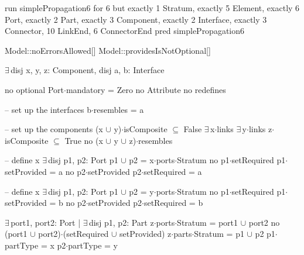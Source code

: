 run simplePropagation6 for 6 but exactly 1 Stratum, exactly 5 Element, exactly 6 Port, exactly 2 Part, exactly 3 Component, exactly 2 Interface, exactly 3 Connector, 10 LinkEnd, 6 ConnectorEnd
pred simplePropagation6
{
  Model::noErrorsAllowed[]
  Model::providesIsNotOptional[]

  $\exists\,$disj x, y, z: Component,
       disj a, b: Interface
  {
    no optional
    Port$\cdot$mandatory = Zero
    no Attribute
    no redefines
  
    -- set up the interfaces
    b$\cdot$resembles = a    
  
    -- set up the components
    (x $\cup$ y)$\cdot$isComposite $\subseteq$ False
    $\exists\,$x$\cdot$links
    $\exists\,$y$\cdot$links
    z$\cdot$isComposite $\subseteq$ True
    no (x $\cup$ y $\cup$ z)$\cdot$resembles
    
    -- define x
    $\exists\,$disj p1, p2: Port
    {
      p1 $\cup$ p2 = x$\cdot$ports$\cdot$Stratum
      no p1$\cdot$setRequired
      p1$\cdot$setProvided = a
      no p2$\cdot$setProvided
      p2$\cdot$setRequired = a
    }
    
    -- define x
    $\exists\,$disj p1, p2: Port
    {
      p1 $\cup$ p2 = y$\cdot$ports$\cdot$Stratum
      no p1$\cdot$setRequired
      p1$\cdot$setProvided = b
      no p2$\cdot$setProvided
      p2$\cdot$setRequired = b
    }
    
    $\exists\,$port1, port2: Port | $\exists\,$disj p1, p2: Part
    {
      z$\cdot$ports$\cdot$Stratum = port1 $\cup$ port2
      no (port1 $\cup$ port2)$\cdot$(setRequired $\cup$ setProvided)
      z$\cdot$parts$\cdot$Stratum = p1 $\cup$ p2
      p1$\cdot$partType = x
      p2$\cdot$partType = y
    }
  }
}

